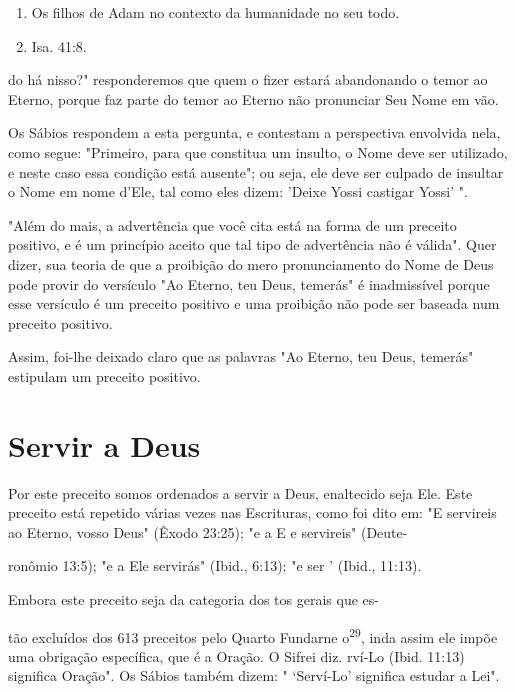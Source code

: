 \begin{itemize}
\begin{enumrate}
\begin{itemize}
\begin{enumerate}
\def\labelenumi{\arabic{enumi}.}
\setcounter{enumi}{26}
\item
 
 Os filhos de Adam no contexto da humanidade no seu todo.
 
\item
 
 Isa. 41:8.
 
\end{enumerate}




do há nisso?" responderemos que quem o fizer estará abandonando o temor
ao Eterno, porque faz parte do temor ao Eterno não pronunciar Seu Nome
em vão.

Os Sábios respondem a esta pergunta, e contestam a perspectiva
en­volvida nela, como segue: "Primeiro, para que constitua um insulto, o
Nome deve ser utilizado, e neste caso essa condição está ausente"; ou
seja, ele deve ser culpado de insultar o Nome em nome d'Ele, tal como
eles dizem: 'Deixe Yossi castigar Yossi' ".

"Além do mais, a advertência que você cita está na forma de um pre­ceito
positivo, e é um princípio aceito que tal tipo de advertência não é
váli­da". Quer dizer, sua teoria de que a proibição do mero
pronunciamento do Nome de Deus pode provir do versículo "Ao Eterno, teu
Deus, temerás" é inad­missível porque esse versículo é um preceito
positivo e uma proibição não po­de ser baseada num preceito positivo.

Assim, foi-lhe deixado claro que as palavras "Ao Eterno, teu Deus,
temerás" estipulam um preceito positivo.


\section{Servir a Deus}

Por este preceito somos ordenados a servir a Deus, enaltecido seja Ele.
Este preceito está repetido várias vezes nas Escrituras, como foi dito
em: "E servireis ao Eterno, vosso Deus" (Êxodo 23:25); "e a E e
servireis" (Deute-

ronômio 13:5); "e a Ele servirás" (Ibid., 6:13); "e ser ' (Ibid.,
11:13).

Embora este preceito seja da categoria dos tos gerais que es-

tão excluídos dos 613 preceitos pelo Quarto Fundarne
o\textsuperscript{29}, inda assim ele im­põe uma obrigação específica,
que é a Oração. O Sifrei diz. rví-Lo (Ibid. 11:13) significa Oração". Os
Sábios também dizem: " `Serví-Lo' significa estudar a Lei".


\end{itemize}
\end{enumrate}
\end{itemize}
